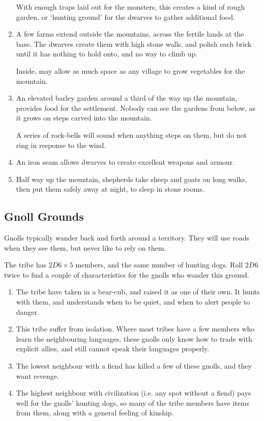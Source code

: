 \begin{multicols}{2}
\begin{enumerate}
  With enough traps laid out for the monsters, this creates a kind of rough garden, or `hunting ground' for the dwarves to gather additional food.
  \item
  A few farms extend outside the mountains, across the fertile lands at the base.
  The dwarves create them with high stone walls, and polish each brick until it has nothing to hold onto, and no way to climb up.

  Inside, may allow as much space as any \gls{village} to grow vegetables for the mountain.
  \item
  An elevated barley garden around a third of the way up the mountain, provides food for the settlement.
  Nobody can see the gardens from below, as it grows on steps carved into the mountain.

  A series of rock-bells will sound when anything steps on them, but do not ring in response to the wind.
  \item
  An iron seam allows dwarves to create excellent weapons and armour.
  \item
  Half way up the mountain, shepherds take sheep and goats on long walks, then put them safely away at night, to sleep in stone rooms.
\end{enumerate}

\subsection{Gnoll Grounds}

Gnolls typically wander back and forth around a territory.
They will use roads when they see them, but never like to rely on them.

The tribe has $2D6 \times 5$ members, and the same number of hunting dogs.
Roll $2D6$ twice to find a couple of characteristics for the gnolls who wander this ground.

\begin{enumerate}
  \item
  The tribe have taken in a bear-cub, and raised it as one of their own.
  It hunts with them, and understands when to be quiet, and when to alert people to danger.
  \item
  This tribe suffer from isolation.
  Where most tribes have a few members who learn the neighbouring languages, these gnolls only know how to trade with explicit allies, and still cannot speak their languages properly.
  \item
  The lowest neighbour with a fiend has killed a few of these gnolls, and they want revenge.
  \item
  The highest neighbour with civilization (i.e. any spot without a fiend) pays well for the gnolls' hunting dogs, so many of the tribe members have items from them, along with a general feeling of kinship.


\end{enumerate}
\end{multicols}
